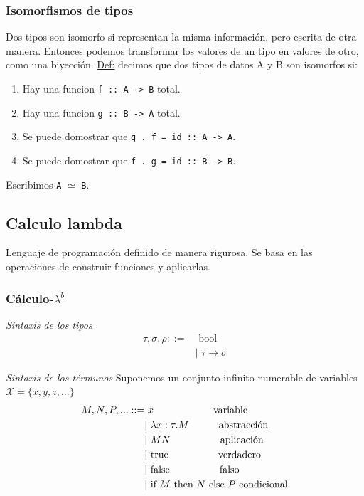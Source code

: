 \documentclass[12pt]{extarticle}
\def\definicion{\newline\underline{Def:} }
\def\ssspace{\space\space\space}
\newcommand\hsline[1]{\texttt{#1}}
\begin{document}
\subsubsection{Isomorfismos de tipos}
Dos tipos son isomorfo si representan la misma información, pero escrita de otra manera. Entonces podemos transformar los valores de un tipo en valores de otro, como una biyección.
\definicion decimos que dos tipos de datos A y B son isomorfos si:
\begin{enumerate}
\itemsep-0.35em 
\item Hay una funcion \hsline{f :: A -> B} total.
\item Hay una funcion \hsline{g :: B -> A} total.
\item Se puede domostrar que \hsline{g . f = id :: A -> A}.
\item Se puede domostrar que \hsline{f . g = id :: B -> B}.
\end{enumerate}
Escribimos \hsline{A} $\simeq$ \hsline{B}.


\subsection{Calculo lambda}
Lenguaje de programación definido de manera rigurosa. Se basa en las operaciones de construir funciones y aplicarlas.

\subsubsection{Cálculo-$\lambda^b$}
\textit{Sintaxis de los tipos}
\begin{align*}
  \tau, \sigma, \rho ::=& \text{ bool} \\
  &\text{| } \tau \rightarrow \sigma
\end{align*}

\textit{Sintaxis de los térmunos}
Suponemos un conjunto infinito numerable de variables $\mathcal{X} = \{x,y,z,...\}$
\begin{align*}
  M,N,P,... ::=& \text{ }x \text{\ssspace\ssspace\ssspace\ssspace\ssspace\ssspace  variable}\\
  &\text{| }\lambda x : \tau. M \text{\ssspace\ssspace\ssspace  abstracción}\\
  &\text{| }M N \text{\ssspace\ssspace\ssspace\ssspace\ssspace  aplicación}\\
  &\text{| true} \text{\ssspace\ssspace\ssspace\ssspace\ssspace  verdadero}\\
  &\text{| false} \text{\ssspace\ssspace\ssspace\ssspace\ssspace  falso}\\
  &\text{| if }M \text{ then }N \text{ else } P \text{  condicional}\\
\end{align*}
\end{document}
